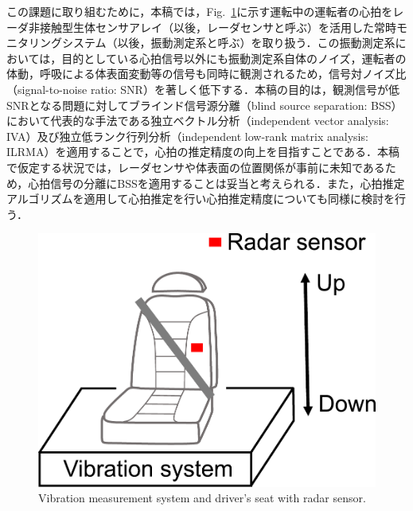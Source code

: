\documentclass[10.5pt]{jarticle}
\begin{document}
この課題に取り組むために，本稿では，Fig.~\ref{fig:sensorstructure}に示す運転中の運転者の心拍をレーダ非接触型生体センサアレイ（以後，レーダセンサと呼ぶ）を活用した常時モニタリングシステム（以後，振動測定系と呼ぶ）を取り扱う．この振動測定系においては，目的としている心拍信号以外にも振動測定系自体のノイズ，運転者の体動，呼吸による体表面変動等の信号も同時に観測されるため，信号対ノイズ比（signal-to-noise ratio: SNR）を著しく低下する．本稿の目的は，観測信号が低SNRとなる問題に対してブラインド信号源分離（blind source separation: BSS）\cite{originica}において代表的な手法である独立ベクトル分析（independent vector analysis: IVA\cite{Kim2007_iva, auxIVA}）及び独立低ランク行列分析（independent low-rank matrix analysis: ILRMA\cite{ILRMA, Kitamura2018_ilrma}）を適用することで，心拍の推定精度の向上を目指すことである．本稿で仮定する状況では，レーダセンサや体表面の位置関係が事前に未知であるため，心拍信号の分離にBSSを適用することは妥当と考えられる．また，心拍推定アルゴリズムを適用して心拍推定を行い心拍推定精度についても同様に検討を行う．

\begin{figure}[tb]
  \centering
  \vspace{0pt} %
  \includegraphics[width=0.6\columnwidth]{sensorstructure.pdf}
  \vspace{0pt} %
  \caption{Vibration measurement system and driver's seat with radar sensor.}
  \vspace{-10pt} %
  \label{fig:sensorstructure}
\end{figure}
\end{document}
